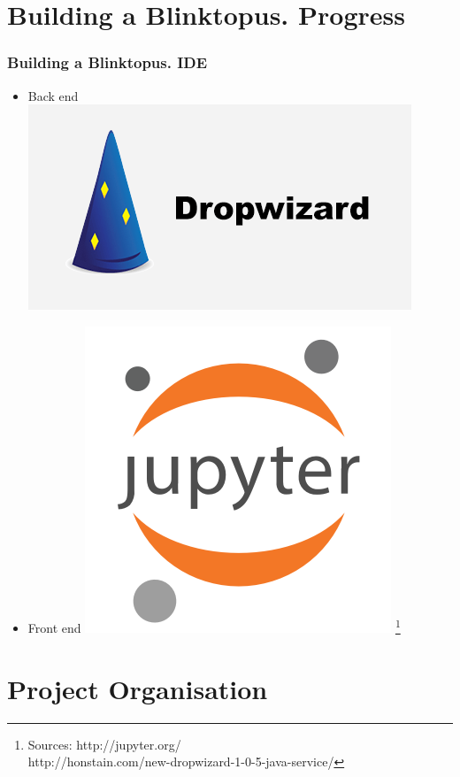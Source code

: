 \documentclass{beamer}
\begin{document}
\section{Building a Blinktopus. Progress}
\begin{frame}
\frametitle{Building a Blinktopus. IDE}
\begin{itemize}
\item{Back end}
\includegraphics[scale=0.3]{img/dropwizard.png}
\vspace{0.25 cm}
\item{Front end}
\includegraphics[scale=0.2]{img/jpnotebook.png}
\footnote{\tiny 
Sources: http://jupyter.org/\\
http://honstain.com/new-dropwizard-1-0-5-java-service/}
\end{itemize}
\end{frame}

\section{Project Organisation}
\end{document}
